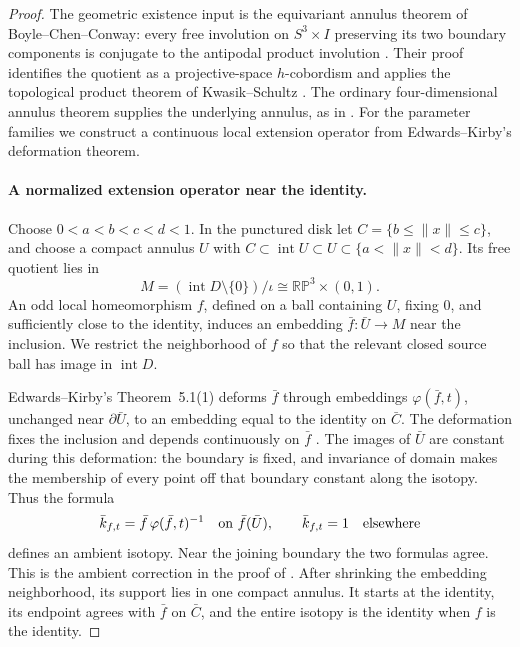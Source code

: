 \begin{proof}
The geometric existence input is the equivariant annulus theorem
of Boyle--Chen--Conway: every free involution on $S^3\times I$
preserving its two boundary components is conjugate to the
antipodal product involution
\cite[Theorem~2.3, p.~6]{BoyleChenConway2025}.
Their proof identifies the quotient as a projective-space
$h$-cobordism and applies the topological product theorem of
Kwasik--Schultz
\cite[Theorem~2.1, p.~530; proof pp.~530--532]{KwasikSchultz1989}.
The ordinary four-dimensional annulus theorem supplies the
underlying annulus, as in
\cite[Theorem~1.4, p.~15]{BoyleChenConway2025}.
For the parameter families we construct a continuous local
extension operator from Edwards--Kirby's deformation theorem.

\paragraph{A normalized extension operator near the identity.}
Choose $0<a<b<c<d<1$.  In the punctured disk let
$C=\{b\leq\|x\|\leq c\}$, and choose a compact annulus
$U$ with $C\subset\operatorname{int}U\subset
U\subset\{a<\|x\|<d\}$.  Its free quotient lies in
\[
 M=(\operatorname{int}D\setminus\{0\})/\iota
           \cong\mathbb{RP}^3\times(0,1).
\]
An odd local homeomorphism $f$, defined on a ball containing
$U$, fixing $0$, and sufficiently close to the identity,
induces an embedding $\bar f:\bar U\to M$ near the inclusion.
We restrict the neighborhood of $f$ so that the relevant
closed source ball has image in $\operatorname{int}D$.

Edwards--Kirby's Theorem~5.1(1) deforms $\bar f$ through
embeddings $\varphi(\bar f,t)$, unchanged near $\partial\bar U$,
to an embedding equal to the identity on $\bar C$.  The
deformation fixes the inclusion and depends continuously on
$\bar f$ \cite[p.~70]{EdwardsKirby1971}.
The images of $\bar U$ are constant during this deformation:
the boundary is fixed, and invariance of domain makes the
membership of every point off that boundary constant along
the isotopy.  Thus the formula
\[
 \bar k_{f,t}=\bar f\,\varphi(\bar f,t)^{-1}
 \quad\hbox{on }\bar f(\bar U),
 \qquad \bar k_{f,t}=1\quad\hbox{elsewhere}
\]
defines an ambient isotopy.  Near the joining boundary the
two formulas agree.  This is the ambient correction in the
proof of \cite[Corollary~1.2, p.~79]{EdwardsKirby1971}.
After shrinking the embedding neighborhood, its support lies
in one compact annulus.  It starts at the identity, its
endpoint agrees with $\bar f$ on $\bar C$, and the entire
isotopy is the identity when $f$ is the identity.


\end{proof}
